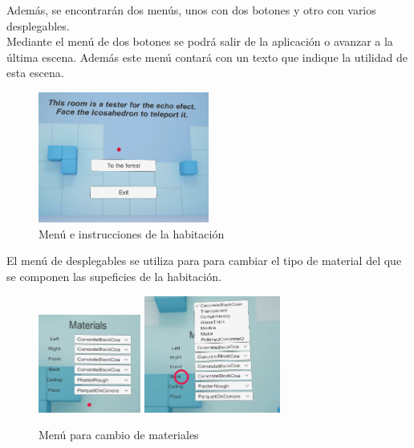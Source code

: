 \quad Además, se encontrarán dos menús, unos con dos botones y otro con varios desplegables.\\

\quad Mediante el menú de dos botones se podrá salir de la aplicación o avanzar a la última escena. Además este menú contará con un texto que indique la utilidad de esta escena.\\

\begin{figure}[htb]
	\centering
	\includegraphics[width=0.5\textwidth]{./imagenes/echoMenu}
	\caption{Menú e instrucciones de la habitación}
\end{figure} 

\quad El menú de desplegables se utiliza para para cambiar el tipo de material del que se componen las supeficies de la habitación.\\ 

\begin{figure}[htb]
	\centering
	\includegraphics[width=0.3\textwidth]{./imagenes/materialMenu}
	\includegraphics[width=0.4\textwidth]{./imagenes/materialMenuDeploy}
	\caption{Menú para cambio de materiales}
\end{figure} 
	
